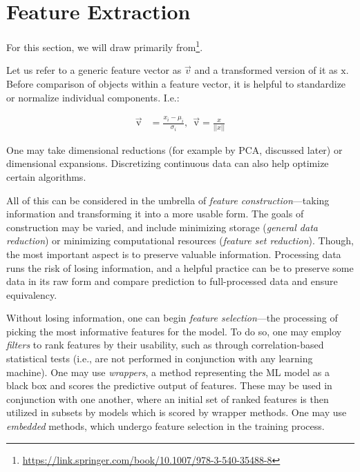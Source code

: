 \section{Feature Extraction}

For this section, we will draw primarily from\footnote{\url{https://link.springer.com/book/10.1007/978-3-540-35488-8}}.\newline

Let us refer to a generic feature vector as $\Vec{v}$ and a transformed version of it as $\mathrm{x}$. Before comparison of objects within a feature vector, it is helpful to standardize or normalize individual components. I.e.:

\begin{equation}
\begin{split}
    \Vec{\mathrm{v}} &= \frac{x_i - \mu_i}{\sigma_i},\:\: \Vec{\mathrm{v}} = \frac{x}{||x||}
\end{split}
\end{equation}

One may take dimensional reductions (for example by PCA, discussed later) or dimensional expansions. Discretizing continuous data can also help optimize certain algorithms.\newline

All of this can be considered in the umbrella of \textit{feature construction}---taking information and transforming it into a more usable form. The goals of construction may be varied, and include minimizing storage (\textit{general data reduction}) or minimizing computational resources (\textit{feature set reduction}). Though, the most important aspect is to preserve valuable information. Processing data runs the risk of losing information, and a helpful practice can be to preserve some data in its raw form and compare prediction to full-processed data and ensure equivalency.\newline

Without losing information, one can begin \textit{feature selection}---the processing of picking the most informative features for the model. To do so, one may employ \textit{filters} to rank features by their usability, such as through correlation-based statistical tests (i.e., are not performed in conjunction with any learning machine). One may use \textit{wrappers}, a method representing the ML model as a black box and scores the predictive output of features. These may be used in conjunction with one another, where an initial set of ranked features is then utilized in subsets by models which is scored by wrapper methods. One may use \textit{embedded} methods, which undergo feature selection in the training process. 


